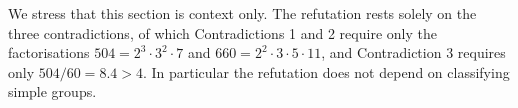 \documentclass[11pt]{article}
\theoremstyle{definition}
\theoremstyle{remark}
\begin{document}
We stress that this section is context only. The refutation rests solely on the three
contradictions, of which Contradictions 1 and 2 require only the factorisations
$504 = 2^{3}\cdot3^{2}\cdot7$ and $660 = 2^{2}\cdot3\cdot5\cdot11$, and Contradiction 3
requires only $504/60 = 8.4 > 4$. In particular the refutation does not depend on
classifying simple groups.
\end{document}
